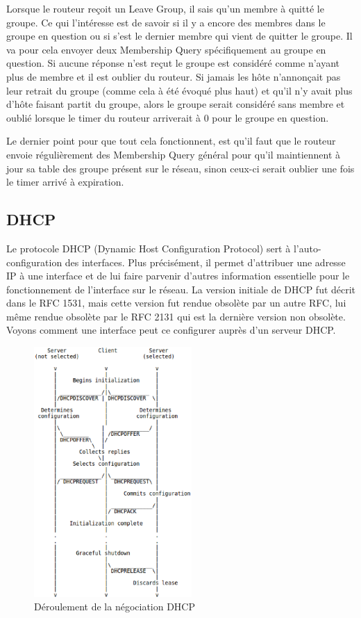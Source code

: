 Lorsque le routeur reçoit un Leave Group, il sais qu'un membre à quitté le
groupe. Ce qui l'intéresse est de savoir si il y a encore des membres dans le
groupe en question ou si s'est le dernier membre qui vient de quitter le
groupe. Il va pour cela envoyer deux Membership Query spécifiquement au groupe
en question. Si aucune réponse n'est reçut le groupe est considéré comme
n'ayant plus de membre et il est oublier du routeur.  Si jamais les hôte
n'annonçait pas leur retrait du groupe (comme cela à été évoqué plus haut) et
qu'il n'y avait plus d'hôte faisant partit du groupe, alors le groupe serait
considéré sans membre et oublié lorsque le timer du routeur arriverait à 0 pour
le groupe en question.

Le dernier point pour que tout cela fonctionnent, est qu'il faut que le routeur
envoie régulièrement des Membership Query général pour qu'il maintiennent à
jour sa table des groupe présent sur le réseau, sinon ceux-ci serait oublier
une fois le timer arrivé à expiration.



\subsection{DHCP}
Le protocole DHCP (Dynamic Host Configuration Protocol) sert à l'auto-configuration
des interfaces. Plus précisément, il  permet d'attribuer une adresse IP à une
interface et de lui faire parvenir d'autres information essentielle pour le
fonctionnement de l'interface sur le réseau. La version initiale de DHCP fut décrit
dans le RFC 1531\cite{url-RFC-DHCP1}, mais cette version fut rendue obsolète par un autre
RFC, lui même rendue obsolète par le RFC 2131\cite{url-RFC-DHCP2} qui est la dernière version non
obsolète. Voyons comment une interface peut ce configurer auprès d'un serveur DHCP.

\begin{figure}[h]
\centering
\includegraphics[width=6cm]{./pics/timeline_dhcp.eps}
\caption{Déroulement de la négociation DHCP}
\label{fig:timelinedhcp}
\end{figure}

